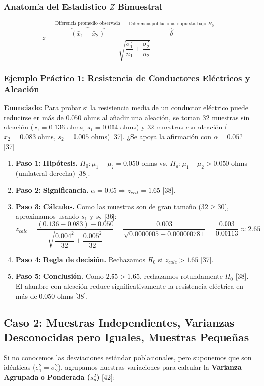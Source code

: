 \documentclass{article}
\begin{document}
\subsubsection*{Anatomía del Estadístico $Z$ Bimuestral}
\[
z = \frac{ \overbrace{(\bar{x}_1 - \bar{x}_2)}^{\text{Diferencia promedio observada}} - \overbrace{\delta}^{\text{Diferencia poblacional supuesta bajo } H_0} }{ \sqrt{\dfrac{\sigma_1^2}{n_1} + \dfrac{\sigma_2^2}{n_2}} }
\]

\subsubsection*{Ejemplo Práctico 1: Resistencia de Conductores Eléctricos y Aleación}
\textbf{Enunciado:} Para probar si la resistencia media de un conductor eléctrico puede reducirse en más de $0.050$ ohms al añadir una aleación, se toman 32 muestras sin aleación ($\bar{x}_1 = 0.136$ ohms, $s_1 = 0.004$ ohms) y 32 muestras con aleación ($\bar{x}_2 = 0.083$ ohms, $s_2 = 0.005$ ohms) [37]. ¿Se apoya la afirmación con $\alpha = 0.05$? [37]

\begin{enumerate}
    \item \textbf{Paso 1: Hipótesis.} $H_0: \mu_1 - \mu_2 = 0.050$ ohms vs. $H_a: \mu_1 - \mu_2 > 0.050$ ohms (unilateral derecha) [38].
    \item \textbf{Paso 2: Significancia.} $\alpha = 0.05 \Rightarrow z_{crit} = 1.65$ [38].
    \item \textbf{Paso 3: Cálculos.} Como las muestras son de gran tamaño ($32 \ge 30$), aproximamos usando $s_1$ y $s_2$ [36]:
    \[
    z_{calc} = \frac{(0.136 - 0.083) - 0.050}{\sqrt{\dfrac{0.004^2}{32} + \dfrac{0.005^2}{32}}} = \frac{0.003}{\sqrt{0.0000005 + 0.000000781}} = \frac{0.003}{0.00113} \approx 2.65
    \]
    \item \textbf{Paso 4: Regla de decisión.} Rechazamos $H_0$ si $z_{calc} > 1.65$ [37].
    \item \textbf{Paso 5: Conclusión.} Como $2.65 > 1.65$, rechazamos rotundamente $H_0$ [38]. El alambre con aleación reduce significativamente la resistencia eléctrica en más de $0.050$ ohms [38].
\end{enumerate}

\subsection{Caso 2: Muestras Independientes, Varianzas Desconocidas pero Iguales, Muestras Pequeñas}
Si no conocemos las desviaciones estándar poblacionales, pero suponemos que son idénticas ($\sigma_1^2 = \sigma_2^2$), agrupamos nuestras variaciones para calcular la \textbf{Varianza Agrupada o Ponderada ($s_p^2$)} [42]:
\end{document}
